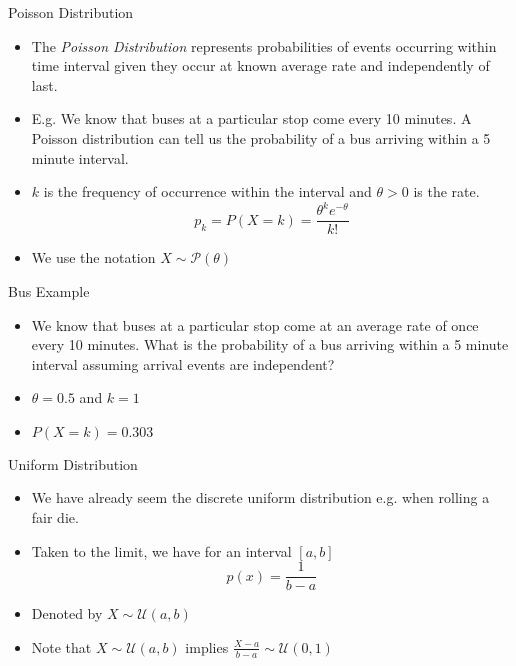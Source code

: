 \documentclass{beamer}
\begin{document}
\begin{frame}{Poisson Distribution}  
\begin{itemize} 
 \item The \emph{Poisson Distribution} represents probabilities of events occurring within time interval given they occur at known average rate and independently of last.  
 \item E.g. We know that buses at a particular stop come every 10 minutes. A Poisson distribution can tell us the probability of a bus arriving within a 5 minute interval. 
 \item $k$ is the frequency of occurrence within the interval and $\theta > 0$ is the rate. 
 \begin{displaymath} 
  p_k = P(X = k) = \frac{\theta^k e^{-\theta}}{k!}
 \end{displaymath}
\item We use the notation $X \sim \mathcal{P}(\theta)$
\end{itemize}
\end{frame}

\begin{frame}{Bus Example}  
\begin{itemize} 
 \item We know that buses at a particular stop come at an average rate of once every 10 minutes. What is the probability of a bus arriving within a 5 minute interval assuming arrival events are independent?
 \item $\theta = 0.5$ and $k = 1$ 
 \item $P(X = k) = 0.303$ 
\end{itemize}
\end{frame}

\begin{frame}{Uniform Distribution}  
 \begin{itemize} 
  \item We have already seem the discrete uniform distribution e.g. when rolling a fair die. 
\item Taken to the limit, we have for an interval $[a, b]$ 
\begin{displaymath} 
 p(x) = \frac{1}{b-a}
\end{displaymath}
\item Denoted by $X \sim \mathcal{U}(a, b)$
\item Note that  $X \sim \mathcal{U}(a, b)$ implies $\frac{X - a}{b - a} \sim \mathcal{U}(0, 1)$
\end{itemize}
\end{frame}
\end{document}
